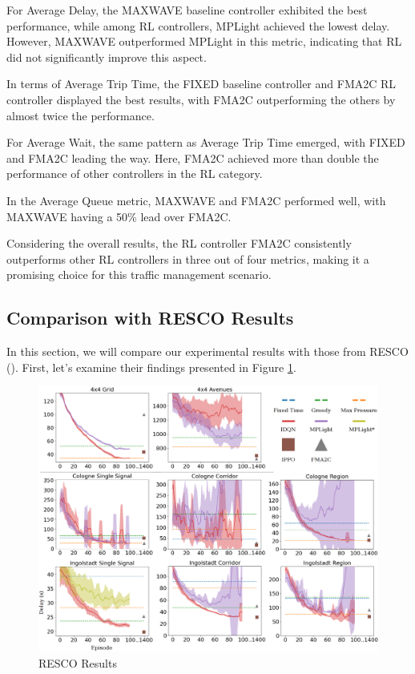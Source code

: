 For Average Delay, the MAXWAVE baseline controller exhibited the best performance, while among RL controllers, MPLight achieved the lowest delay. However, MAXWAVE outperformed MPLight in this metric, indicating that RL did not significantly improve this aspect.

In terms of Average Trip Time, the FIXED baseline controller and FMA2C RL controller displayed the best results, with FMA2C outperforming the others by almost twice the performance.

For Average Wait, the same pattern as Average Trip Time emerged, with FIXED and FMA2C leading the way. Here, FMA2C achieved more than double the performance of other controllers in the RL category.

In the Average Queue metric, MAXWAVE and FMA2C performed well, with MAXWAVE having a 50\% lead over FMA2C.

Considering the overall results, the RL controller FMA2C consistently outperforms other RL controllers in three out of four metrics, making it a promising choice for this traffic management scenario.

\subsection{Comparison with RESCO Results}

In this section, we will compare our experimental results with those from RESCO (\cite{resco}). First, let's examine their findings presented in Figure \ref{fig:resco_results}.

\begin{figure}[h]
    \centering
    \includegraphics[width=1\linewidth]{images/experiments/delays.png}
    \caption{RESCO Results\cite{resco}}
    \label{fig:resco_results}
\end{figure}

